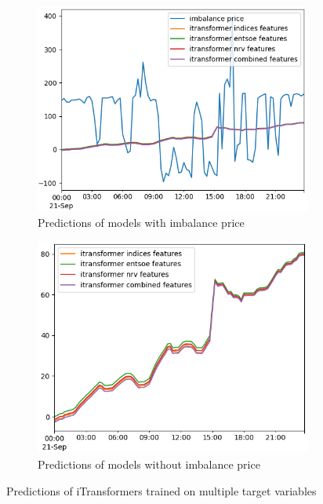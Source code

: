 \documentclass[class=scrbook, crop=false]{standalone}
\begin{document}
\begin{figure}
  \centering
\begin{subfigure}{0.45\textwidth}
  \includegraphics[width=\linewidth]{../images/results/itransformer_target_variables_aep.png}
  \caption{Predictions of models with imbalance price}
\end{subfigure}
\begin{subfigure}{0.45\textwidth}
  \includegraphics[width=\linewidth]{../images/results/itransformer_target_variables_alone.png}
  \caption{Predictions of models without imbalance price}
\end{subfigure}
\caption{Predictions of iTransformers trained on multiple target variables}
\label{Figure::Targets_prediction}
\end{figure}
\end{document}
